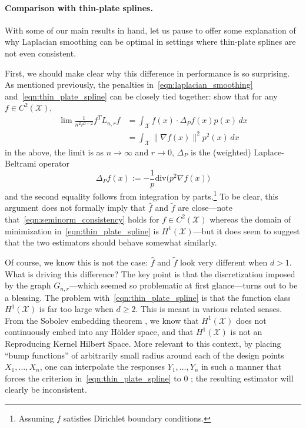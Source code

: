 \documentclass[twoside]{article}
\newcommand{\1}{\mathbf{1}}
\newcommand{\Lap}{L}
\newcommand{\Xset}{\mathcal{X}}
\newcommand{\dive}{\mathrm{div}}
\newcommand{\wt}[1]{\widetilde{#1}}
\newcommand{\wh}[1]{\widehat{#1}}
\theoremstyle{definition}
\theoremstyle{remark}
\begin{document}
\paragraph{Comparison with thin-plate splines.}
With some of our main results in hand, let us pause to offer some explanation of why Laplacian smoothing can be optimal in settings where thin-plate splines are not even consistent.  

First, we should make clear why this difference in performance is so surprising. As mentioned previously, the penalties in~\eqref{eqn:laplacian_smoothing} and~\eqref{eqn:thin_plate_spline} can be closely tied together: \cite{bousquet03} show that for any $f \in C^2(\Xset)$, 
\begin{equation}
\label{eqn:seminorm_consistency}
\begin{aligned}
\lim \frac{1}{n^2 r^{d + 2}} f^T \Lap_{n,r} f & = \int_{\Xset} f(x) \cdot \Delta_Pf(x) p(x) \,dx \\
& = \int_{\Xset} \|\nabla f(x)\|^2 p^2(x) \,dx
\end{aligned}
\end{equation}
in the above, the limit is as $n \to \infty$ and $r \to 0$, $\Delta_P$ is the (weighted) Laplace-Beltrami operator
\begin{equation*}
\Delta_Pf(x) := -\frac{1}{p} \dive\bigl(p^2\nabla f(x))
\end{equation*}
and the second equality follows from integration by parts.\footnote{Assuming $f$ satisfies Dirichlet boundary conditions.} To be clear, this argument does not formally imply that $\wh{f}$ and $\wt{f}$ are close---note that~\eqref{eqn:seminorm_consistency} holds for $f \in C^2(\Xset)$ whereas the domain of minimization in~\eqref{eqn:thin_plate_spline} is $H^1(\Xset)$---but it does seem to suggest that the two estimators should behave somewhat similarly. 

Of course, we know this is not the case: $\wh{f}$ and $\wt{f}$ look very different when $d > 1$. What is driving this difference? The key point is that the discretization imposed by the graph $G_{n,r}$---which seemed so problematic at first glance---turns out to be a blessing. The problem with~\eqref{eqn:thin_plate_spline} is that the function class $H^1(\Xset)$ is far too large when $d \geq 2$. This is meant in various related senses. From the Sobolev embedding theorem \cite{evans10}, we know that $H^1(\Xset)$ does not continuously embed into any H\"{o}lder space, and that $H^1(\Xset)$ is not an Reproducing Kernel Hilbert Space. More relevant to this context, by placing ``bump functions'' of arbitrarily small radius around each of the design points $X_1,\ldots,X_n$, one can interpolate the responses $Y_1,\ldots,Y_n$ in such a manner that forces the criterion in~\eqref{eqn:thin_plate_spline} to 0 \citep{green93}; the resulting estimator will clearly be inconsistent.
\end{document}
